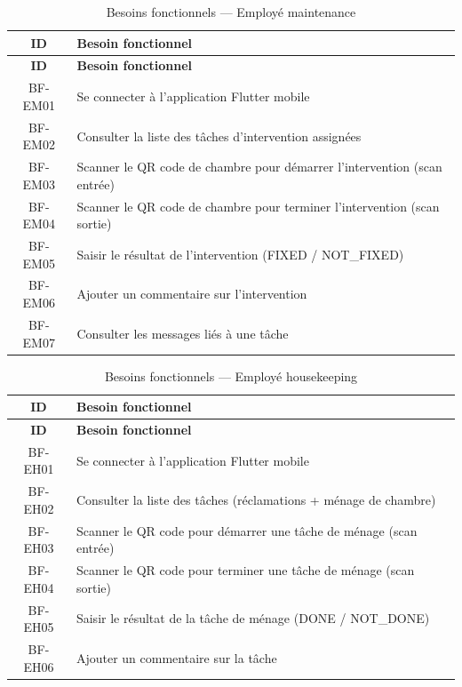 \begin{longtable}{|c|p{12cm}|}
\caption{Besoins fonctionnels — Employé maintenance} \label{tab:bf_employee_maint} \\
\hline
\textbf{ID} & \textbf{Besoin fonctionnel} \\
\hline
\endfirsthead
\hline
\textbf{ID} & \textbf{Besoin fonctionnel} \\
\hline
\endhead
BF-EM01 & Se connecter à l'application Flutter mobile \\
\hline
BF-EM02 & Consulter la liste des tâches d'intervention assignées \\
\hline
BF-EM03 & Scanner le QR code de chambre pour démarrer l'intervention (scan entrée) \\
\hline
BF-EM04 & Scanner le QR code de chambre pour terminer l'intervention (scan sortie) \\
\hline
BF-EM05 & Saisir le résultat de l'intervention (FIXED / NOT\_FIXED) \\
\hline
BF-EM06 & Ajouter un commentaire sur l'intervention \\
\hline
BF-EM07 & Consulter les messages liés à une tâche \\
\hline
\end{longtable}

\begin{longtable}{|c|p{12cm}|}
\caption{Besoins fonctionnels — Employé housekeeping} \label{tab:bf_employee_hk} \\
\hline
\textbf{ID} & \textbf{Besoin fonctionnel} \\
\hline
\endfirsthead
\hline
\textbf{ID} & \textbf{Besoin fonctionnel} \\
\hline
\endhead
BF-EH01 & Se connecter à l'application Flutter mobile \\
\hline
BF-EH02 & Consulter la liste des tâches (réclamations + ménage de chambre) \\
\hline
BF-EH03 & Scanner le QR code pour démarrer une tâche de ménage (scan entrée) \\
\hline
BF-EH04 & Scanner le QR code pour terminer une tâche de ménage (scan sortie) \\
\hline
BF-EH05 & Saisir le résultat de la tâche de ménage (DONE / NOT\_DONE) \\
\hline
BF-EH06 & Ajouter un commentaire sur la tâche \\
\hline
\end{longtable}

